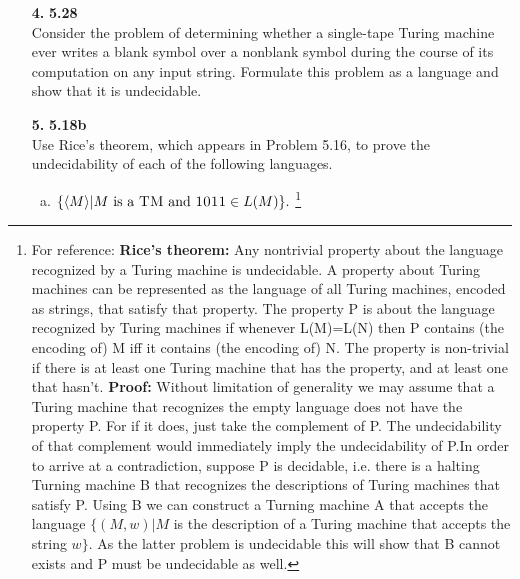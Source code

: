\begin{enumerate}
\item[\textbf{4.}] \textbf{5.28} \\
Consider the problem of determining whether a single-tape Turing machine ever writes a blank symbol over a nonblank symbol during the course of its computation on any input string. Formulate this problem as a language and show that it is undecidable. 
\newline\newline
\answer{}

\pagebreak



\item[\textbf{5.}] \textbf{5.18b} \\
Use Rice's theorem, which appears in Problem 5.16, to prove the undecidability of each of the following languages. 
\begin{enumerate}[(b)]
\item $\{ \langle M \rangle | M \textrm{ is a } \textsc{TM} \textrm{ and } \textsc{1011} \in L(M)\}.$
\newline\footnote{For reference: \textbf{Rice's theorem:} Any nontrivial property about the language recognized by a Turing machine is undecidable. \newline A property about Turing machines can be represented as the language of all Turing machines, encoded as strings, that satisfy that property. The property P is about the language recognized by Turing machines if whenever L(M)=L(N) then P contains (the encoding of) M iff it contains (the encoding of) N. The property is non-trivial if there is at least one Turing machine that has the property, and at least one that hasn't. 
\newline\newline \textbf{Proof: } Without limitation of generality we may assume that a Turing machine that recognizes the empty language does not have the property P. For if it does, just take the complement of P. The undecidability of that complement would immediately imply the undecidability of P.\newline\newline In order to arrive at a contradiction, suppose P is decidable, i.e. there is a halting Turning machine B that recognizes the descriptions of Turing machines that satisfy P. Using B we can construct a Turning machine A that accepts the language $\{(M,w)| M$ is the description of a Turing machine that accepts the string $w\}$. As the latter problem is undecidable this will show that B cannot exists and P must be undecidable as well.
}
\end{enumerate}
\end{enumerate}
